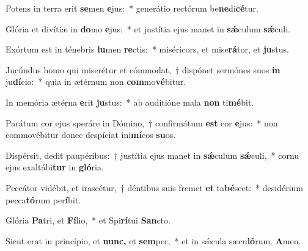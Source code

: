 \item Potens in terra erit \textbf{se}men \textbf{e}jus:~* generátio rectórum be\textbf{ne}di\textbf{cé}tur.
\item Glória et divítiæ in \textbf{do}mo \textbf{e}jus:~* et justítia ejus manet in \textbf{sǽ}culum \textbf{sǽ}culi.
\item Exórtum est in ténebris \textbf{lu}men \textbf{re}ctis:~* miséricors, et mise\textbf{rá}tor, et \textbf{ju}stus.
\item Jucúndus homo qui miserétur et cómmodat,~† dispónet sermónes suos \textbf{in} ju\textbf{dí}cio:~* quia in ætérnum non \textbf{com}mo\textbf{vé}bitur.
\item In memória ætérna \textbf{e}rit \textbf{ju}stus:~* ab auditióne mala \textbf{non} ti\textbf{mé}bit.
\item Parátum cor ejus speráre in Dómino,~† confirmátum \textbf{est} cor \textbf{e}jus:~* non commovébitur donec despíciat ini\textbf{mí}cos \textbf{su}os.
\item Dispérsit, dedit paupéribus:~† justítia ejus manet in \textbf{sǽ}culum \textbf{sǽ}culi,~* cornu ejus exaltábi\textbf{tur} in \textbf{gló}ria.
\item Peccátor vidébit, et irascétur,~† déntibus suis fremet \textbf{et} ta\textbf{bé}scet:~* desidérium pecca\textbf{tó}rum per\textbf{í}bit.
\item Glória \textbf{Pa}tri, et \textbf{Fí}lio,~* et Spi\textbf{rí}tui \textbf{San}cto.
\item Sicut erat in princípio, et \textbf{nunc,} et \textbf{sem}per,~* et in sǽcula sæcu\textbf{ló}rum. \textbf{A}men.
